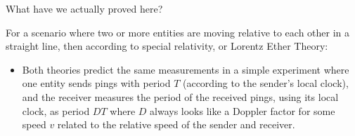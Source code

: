 \documentclass[a4paper]{article}
\theoremstyle{plain}
\theoremstyle{definition}
\begin{document}
What have we actually proved here?

For a scenario where two or more entities are moving relative to each
other in a straight line, then according to special relativity, or
Lorentz Ether Theory:

\begin{itemize}

\item Both theories predict the same measurements in a simple
  experiment where one entity sends pings with period $T$ (according
  to the sender's local clock), and the receiver measures the period
  of the received pings, using its local clock, as period $DT$ where
  $D$ always looks like a Doppler factor for some speed $v$ related to
  the relative speed of the sender and receiver.

\end{itemize}









	
\end{document}
